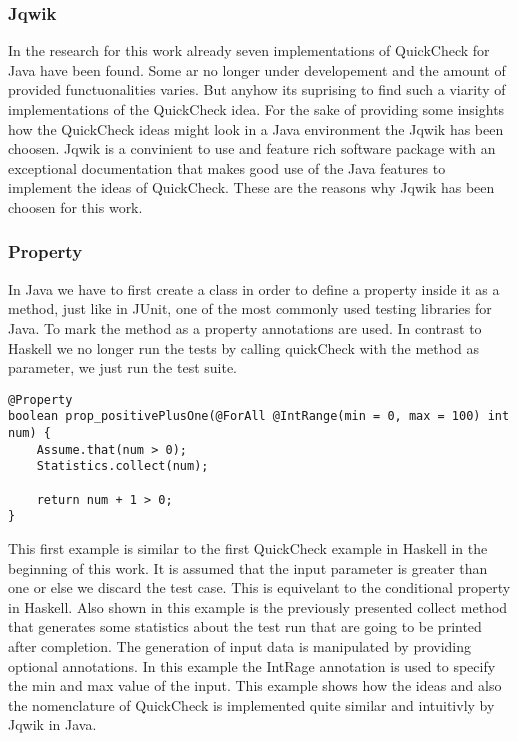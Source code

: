 \documentclass[a4paper, 12pt]{article} %
\begin{document}
\subsubsection{Jqwik}

In the research for this work already seven implementations of QuickCheck for Java have been found. Some ar no longer under developement and the amount of provided functuonalities varies. But anyhow its suprising to find such a viarity of implementations of the QuickCheck idea. For the sake of providing some insights how the QuickCheck ideas might look in a Java environment the Jqwik \cite{jqwik} has been choosen. Jqwik is a convinient to use and feature rich software package with an exceptional documentation that makes good use of the Java features to implement the ideas of QuickCheck. These are the reasons why Jqwik has been choosen for this work.

\subsubsection{Property}

In Java we have to first create a class in order to define a property inside it as a method, just like in JUnit, one of the most commonly used testing libraries for Java. To mark the method as a property annotations are used. In contrast to Haskell we no longer run the tests by calling quickCheck with the method as parameter, we just run the test suite. 

\begin{verbatim}
@Property
boolean prop_positivePlusOne(@ForAll @IntRange(min = 0, max = 100) int num) {
    Assume.that(num > 0);
    Statistics.collect(num);
    
    return num + 1 > 0;
}
\end{verbatim}

This first example is similar to the first QuickCheck example in Haskell in the beginning of this work. It is assumed that the input parameter is greater than one or else we discard the test case. This is equivelant to the conditional property in Haskell. Also shown in this example is the previously presented collect method that generates some statistics about the test run that are going to be printed after completion. The generation of input data is manipulated by providing optional annotations. In this example the IntRage annotation is used to specify the min and max value of the input. This example shows how the ideas and also the nomenclature of QuickCheck is implemented quite similar and intuitivly by Jqwik in Java.
\end{document}
